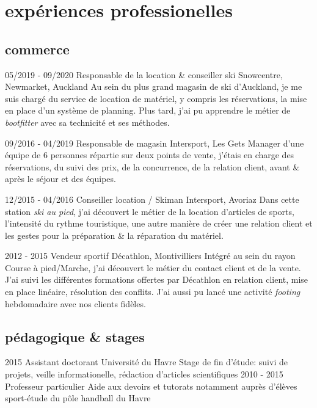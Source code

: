 \documentclass[]{farangoth-cv}
\begin{document}
\section{expériences professionelles}
\subsection{commerce}
\begin{entrylist}
  \entry%
  {05/2019 \-- 09/2020}
  {Responsable de la location \& conseiller ski}
  {Snowcentre, Newmarket, Auckland}
  {
    Au sein du plus grand magasin de ski d'Auckland, je me suis chargé du service de location de matériel, y compris les réservations, la mise en place d'un système de planning. Plus tard, j'ai pu apprendre le métier de \emph{bootfitter} avec sa technicité et ses méthodes.
  }
  
  \entry%
  {09/2016 \-- 04/2019}
  {Responsable de magasin}
  {Intersport, Les Gets}
  {%
    Manager d'une équipe de 6 personnes répartie sur deux points de vente,  j'étais en charge des réservations, du suivi des prix, de la concurrence, de la relation client, avant \& après le séjour et des équipes.
  }
  
  \entry%
  {12/2015 \-- 04/2016}
  {Conseiller location / Skiman}
  {Intersport, Avoriaz}
  {%
    Dans cette station \emph{ski au pied}, j'ai découvert le métier de la location d'articles de sports, l'intensité du rythme touristique, une autre manière de créer une relation client et les gestes pour la préparation \& la réparation du matériel.
  }
  
  \entry%
  {2012 \-- 2015}
  {Vendeur sportif}
  {Décathlon, Montivilliers}
  {%
    Intégré au sein du rayon Course à pied/Marche, j'ai découvert le métier du contact client et de la vente. J'ai suivi les différentes formations offertes par Décathlon en relation client, mise en place linéaire, résolution des conflits. J'ai aussi pu lancé une activité \emph{footing} hebdomadaire avec nos clients fidèles.
  }
\end{entrylist}

\subsection{pédagogique \& stages}
\begin{entrylist}
  \entry%
  {2015}
  {Assistant doctorant}
  {Université du Havre}
  {%
    Stage de fin d'étude: suivi de projets, veille informationelle, rédaction d'articles scientifiques
  }
  \entry%
  {2010 \-- 2015}
  {Professeur particulier}
  {}
  {%
    Aide aux devoirs et tutorats notamment auprès d'élèves sport-étude du pôle handball du Havre
  }
\end{entrylist}
\end{document}
